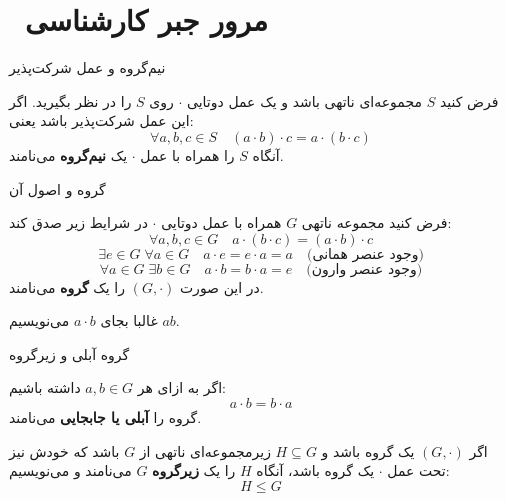 

\section{ مرور جبر کارشناسی}

\begin{frame}[t]{نیم‌گروه و عمل شرکت‌پذیر}
    \begin{definition}
        فرض کنید \( S \) مجموعه‌ای ناتهی باشد و یک عمل دوتایی \(\cdot\) روی \( S \) را در نظر بگیرید.
        اگر این عمل شرکت‌پذیر باشد یعنی:
        \[
            \forall a, b, c \in S \quad (a \cdot b) \cdot c = a \cdot (b \cdot c)
        \]
        آنگاه \( S \) را همراه با عمل \(\cdot\) یک \textbf{نیم‌گروه } می‌نامند.

    \end{definition}


\end{frame}

\begin{frame}[t]{گروه و اصول آن}
    \begin{definition}[گروه]
        فرض کنید مجموعه ناتهی \( G \) همراه با عمل دوتایی \(\cdot\) در شرایط زیر صدق کند:
        \[\forall a, b, c \in G \quad a \cdot (b \cdot c) = (a \cdot b) \cdot c\]
        \[\exists e \in G \; \forall a \in G \quad a \cdot e = e \cdot a = a \quad \text{(وجود عنصر همانی)}\]
        \[\forall a \in G \; \exists b \in G \quad a \cdot b = b \cdot a = e \quad \text{(وجود عنصر وارون)}\]
        در این صورت \( (G, \cdot) \) را یک \textbf{گروه} می‌نامند.

    \end{definition}
    \begin{remark}
        غالبا  بجای \( a \cdot b \) می‌نویسیم \( ab \).

    \end{remark}
\end{frame}

\begin{frame}[t]{گروه آبلی و زیرگروه}
    \begin{definition}
        اگر به ازای هر \( a, b \in G \) داشته باشیم:
        \[
            a \cdot b = b \cdot a
        \]
        گروه را \textbf{آبلی یا جابجایی} می‌نامند.
    \end{definition}


    \begin{definition}[  زیرگروه]
        اگر \( (G, \cdot) \) یک گروه باشد و \( H \subseteq G \) زیرمجموعه‌ای ناتهی از \( G \) باشد که خودش نیز تحت عمل \(\cdot\) یک گروه باشد، آنگاه \( H \) را یک \textbf{زیرگروه} \( G \) می‌نامند و می‌نویسیم:
        \[
            H \leq G
        \]

    \end{definition}
\end{frame}

